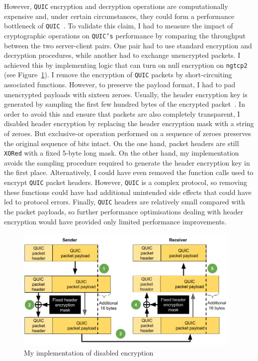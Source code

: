 \documentclass[12pt,a4paper,twoside,openright]{report}
\begin{document}
However, \texttt{QUIC} encryption and decryption operations are computationally expensive and, under certain circumstances, they could form a performance bottleneck of \texttt{QUIC}~\cite{Making_QUIC_Quicker}.
To validate this claim, I had to measure the impact of cryptographic operations on \texttt{QUIC's} performance by comparing the throughput between the two server-client pairs.
One pair had to use standard encryption and decryption procedures, while another had to exchange unencrypted packets.
I achieved this by implementing logic that can turn on null encryption on \texttt{ngtcp2} (see Figure~\ref{fig:my_implementation_of_cryptographic_procedures_of_quic}).
I remove the encryption of \texttt{QUIC} packets by short-circuiting associated functions.
However, to preserve the payload format, I had to pad unencrypted payloads with sixteen zeroes.
Usually, the header encryption key is generated by sampling the first few hundred bytes of the encrypted packet~\cite[Section 5.4.1]{ietf-quic-tls-32}. 
In order to avoid this and ensure that packets are also completely transparent, I disabled header encryption by replacing the header encryption mask with a string of zeroes.
But exclusive-or operation performed on a sequence of zeroes preserves the original sequence of bits intact.
On the one hand, packet headers are still \texttt{XORed} with a fixed 5-byte long mask.
On the other hand, my implementation avoids the sampling procedure required to generate the header encryption key in the first place.
Alternatively, I could have even removed the function calls used to encrypt \texttt{QUIC} packet headers.
However, \texttt{QUIC} is a complex protocol, so removing these functions could have had additional unintended side effects that could have led to protocol errors.
Finally, \texttt{QUIC} headers are relatively small compared with the packet payloads, so further performance optimisations dealing with header encryption would have provided only limited performance improvements.


    \begin{figure}[H]
    \centering
    \includegraphics[width=0.97\textwidth]{figs/my_implementation_of_cryptographic_procedures_of_quic.png}
    \caption[My implementation of disabled encryption]{My implementation of disabled encryption}
    \label{fig:my_implementation_of_cryptographic_procedures_of_quic}
    \end{figure}
\end{document}
